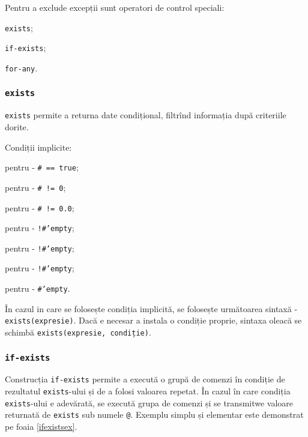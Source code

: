 Pentru a exclude excepții sunt operatori de control speciali:
\begin{icItems}
	\item \texttt{exists};
	\item \texttt{if-exists};
	\item \texttt{for-any}.
\end{icItems}

\subsubsection{\texttt{exists}}

\texttt{exists} permite a returna date condițional, filtrînd informația după criteriile dorite.

Condiții implicite:
\begin{icItems}
	\item
	pentru \bool{} - \texttt{# == true};
	\item
	pentru \integer{} - \texttt{# != 0};
	\item
	pentru \double{} - \texttt{# != 0.0};
	\item
	pentru \str{} - \texttt{!#'empty};
	\item
	pentru \listtype{} - \texttt{!#'empty};
	\item
	pentru \set{} - \texttt{!#'empty};
	\item
	pentru \element{} - \texttt{#'empty}.
\end{icItems}

În cazul in care se folosește condiția implicită, se folosește următoarea sintaxă - \texttt{exists(expresie)}.
Dacă e necesar a instala o condiție proprie, sintaxa oleacă se schimbă \texttt{exists(expresie, condiție)}.

\subsubsection{\texttt{if-exists}}

Construcția \texttt{if-exists} permite a execută o grupă de comenzi în condiție de rezultatul \texttt{exists}-ului și de a folosi valoarea repetat. În cazul în care condiția \texttt{exists}-ului e adevărată, se execută grupa de comenzi și se transmitwe valoare returnată de \texttt{exists} sub numele \texttt{@}.
Exemplu simplu și elementar este demonstrat pe foaia \ref{ifexistsex}.

